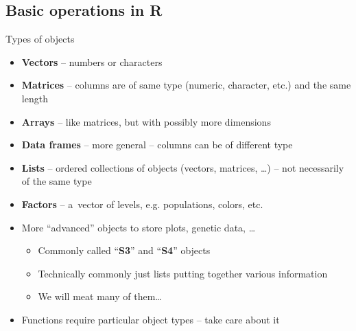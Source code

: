 \documentclass[compress, ucs, xelatex, 11pt, xcolor=svgnames,
  hyperref={
    bookmarks=true,
    unicode=true,
    colorlinks=true,
    pdftitle={Molecular data in R},
    plainpages=false,
    pdfauthor={Vojtech Zeisek},
    pdfsubject={Course about phylogeny and evolution in R},
    pdfcreator={XeLaTeX},
    pdfkeywords={R, evolution, phylogeny, molecular data},
    linkcolor=Tomato,
    anchorcolor=SaddleBrown,
    citecolor=Goldenrod,
    filecolor=DarkMagenta,
    menucolor=Sienna,
    urlcolor=DarkTurquoise,
    pdftex},
  url={hyphens, lowtilde} %
  ]{beamer}
\begin{document}
\subsection{Basic operations in R}

\begin{frame}{Types of objects}
\begin{itemize}
 \item \textbf{Vectors} -- numbers or characters
 \item \textbf{Matrices} -- columns are of same type (numeric, character, etc.) and the same length
 \item \textbf{Arrays} -- like matrices, but with possibly more dimensions
 \item \textbf{Data frames} -- more general -- columns can be of different type
 \item \textbf{Lists} -- ordered collections of objects (vectors, matrices, \ldots) -- not necessarily of the same type
 \item \textbf{Factors} -- a~vector of levels, e.g. populations, colors, etc.
 \item More ``advanced'' objects to store plots, genetic data, \ldots
 \begin{itemize}
  \item Commonly called ``\textbf{S3}'' and ``\textbf{S4}'' objects
  \item Technically commonly just lists putting together various information
  \item We will meat many of them\ldots
 \end{itemize}
 \item Functions require particular object types -- take care about it
\end{itemize}
\end{frame}
\end{document}
